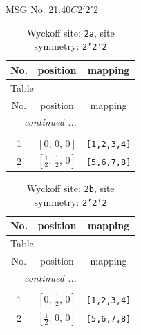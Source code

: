 \documentclass[fleqn,8pt]{jsarticle}
\begin{document}
\setcounter{MaxMatrixCols}{32}

\renewcommand{\tablename}{Table~}
\renewcommand{\figurename}{Figure~}
\begin{center}
\LARGE
MSG No. 21.40\quad$C2'2'2$
\end{center}
\renewcommand{\arraystretch}{1.2}
\begin{longtable}{ccc}
\caption{Wyckoff site: {\tt 2a}, site symmetry: {\tt 2'2'2}}
 \\
 \hline \hline
No. & position & mapping \\ \hline \endfirsthead

\multicolumn{2}{l}{\tablename\ \thetable{}} \\
 \hline \hline
No. & position & mapping \\ \hline \endhead

 \hline \hline
\multicolumn{2}{r}{\footnotesize\it continued ...} \\ \endfoot

 \hline \hline
\multicolumn{2}{r}{} \\ \endlastfoot

1 & $\left[ 0,\, 0,\, 0 \right]$ & {\tt [1,2,3,4]} \\ \hline
2 & $\left[ \frac{1}{2},\, \frac{1}{2},\, 0 \right]$ & {\tt [5,6,7,8]} \\
\end{longtable}
\renewcommand{\arraystretch}{1.2}
\begin{longtable}{ccc}
\caption{Wyckoff site: {\tt 2b}, site symmetry: {\tt 2'2'2}}
 \\
 \hline \hline
No. & position & mapping \\ \hline \endfirsthead

\multicolumn{2}{l}{\tablename\ \thetable{}} \\
 \hline \hline
No. & position & mapping \\ \hline \endhead

 \hline \hline
\multicolumn{2}{r}{\footnotesize\it continued ...} \\ \endfoot

 \hline \hline
\multicolumn{2}{r}{} \\ \endlastfoot

1 & $\left[ 0,\, \frac{1}{2},\, 0 \right]$ & {\tt [1,2,3,4]} \\ \hline
2 & $\left[ \frac{1}{2},\, 0,\, 0 \right]$ & {\tt [5,6,7,8]} \\
\end{longtable}
\renewcommand{\arraystretch}{1.2}
\end{document}
